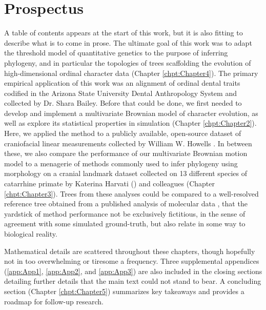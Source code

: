 \section{Prospectus}

A table of contents appears at the start of this work, but it is also fitting to describe what is to come in prose. The ultimate goal of this work was to adapt the threshold model of quantitative genetics to the purpose of inferring phylogeny, and in particular the topologies of trees scaffolding the evolution of high-dimensional ordinal character data (Chapter \ref{chpt:Chapter4}). The primary empirical application of this work was an alignment of ordinal dental traits codified in the Arizona State University Dental Anthropology System \citep{turnerScoringProducesKey1991} and collected by Dr. Shara Bailey. Before that could be done, we first needed to develop and implement a multivariate Brownian model of character evolution, as well as explore its statistical properties in simulation (Chapter \ref{chpt:Chapter2}). Here, we applied the method to a publicly available, open-source dataset of craniofacial linear measurements collected by William W. Howells \citep{howellsCranialVariationMan1973, howellsSkullShapesMap1989, howellsWhoWhoSkulls1995}. In between these, we also compare the performance of our multivariate Brownian motion model to a menagerie of methods commonly used to infer phylogeny using morphology on a cranial landmark dataset collected on 13 different species of catarrhine primate by Katerina Harvati (\citeyear{harvatiNeanderthalTaxonomyReconsidered2004}) and colleagues (Chapter \ref{chpt:Chapter3}). Trees from these analyses could be compared to a well-resolved reference tree obtained from a published analysis of molecular data \citep{arnold10kTreesWebsiteNew2010}, that the yardstick of method performance not be exclusively fictitious, in the sense of agreement with some simulated ground-truth, but also relate in some way to biological reality.

Mathematical details are scattered throughout these chapters, though hopefully not in too overwhelming or tiresome a frequency. Three supplemental appendices (\ref{app:App1}, \ref{app:App2}, and \ref{app:App3}) are also included in the closing sections detailing further details that the main text could not stand to bear. A concluding section (Chapter \ref{chpt:Chapter5}) summarizes key takeaways and provides a roadmap for follow-up research.


